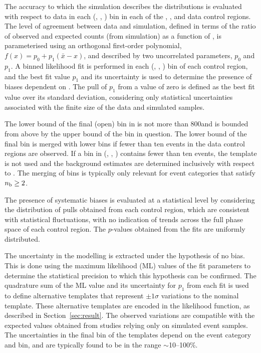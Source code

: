The accuracy to which the simulation describes the \HTmiss
distributions is evaluated with respect to data in each (\njet, \nb,
\scalht) bin in each of the \mj, \mmj, and \gj data control regions. %
The level of agreement between data and simulation, defined in terms
of the ratio of observed and expected counts (from simulation) as a
function of \HTmiss, is parameterised using an orthogonal first-order
polynomial, $f(x) = p_0 + p_1(\bar{x}-x)$, and described by two
uncorrelated parameters, $p_0$ and $p_1$. A binned likelihood fit is
performed in each (\njet, \nb, \scalht) bin of each control region,
and the best fit value $p_1$ and its uncertainty is used to determine
the presence of biases dependent on \HTmiss. The pull of $p_1$ from a
value of zero is defined as the best fit value over its standard
deviation, considering only statistical uncertainties associated with
the finite size of the data and simulated samples.

The lower bound of the final (open) bin in \HTmiss is not more than
800\GeV and is bounded from above by the upper bound of the \scalht
bin in question. The lower bound of the final \HTmiss bin is merged
with lower bins if fewer than ten events in the data control regions
are observed. If a bin in (\njet, \nb, \scalht) contains fewer than
ten events, the \HTmiss template is not used and the background
estimates are determined inclusively with respect to \HTmiss. The
merging of bins is typically only relevant for event categories that
satisfy $n_{\text{b}} \geq 2$.

The presence of systematic biases is evaluated at a statistical level
by considering the distribution of pulls obtained from each control
region, which are consistent with statistical fluctuations, with no
indication of trends across the full phase space of each control
region. The $p$-values obtained from the fits are uniformly
distributed.

The uncertainty in the \HTmiss modelling is extracted under the
hypothesis of no bias. This is done using the maximum likelihood (ML)
values of the fit parameters to determine the statistical precision to
which this hypothesis can be confirmed. The quadrature sum of the ML
value and its uncertainty for $p_1$ from each fit is used to define
alternative templates that represent $\pm1\sigma$ variations to the
nominal \HTmiss template. These alternative templates are encoded in
the likelihood function, as described in Section~\ref{sec:result}. The
observed variations are compatible with the expected values obtained
from studies relying only on simulated event samples. The
uncertainties in the final \HTmiss bin of the templates depend on the
event category and \scalht bin, and are typically found to be in the
range $\sim$10--100\%.


